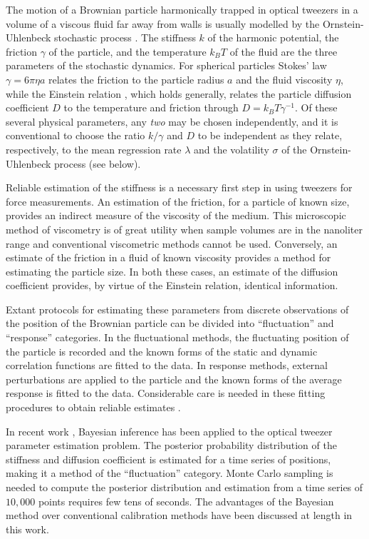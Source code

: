 \documentclass[fleqn,10pt]{wlscirep}
\begin{document}
The motion of a Brownian particle harmonically trapped in optical
tweezers in a volume of a viscous fluid far away from walls is usually
modelled by the Ornstein-Uhlenbeck stochastic process \cite{van1992stochastic,gardiner1985handbook}.
The stiffness $k$ of the harmonic potential, the friction $\gamma$
of the particle, and the temperature $k_{B}T$ of the fluid are the
three parameters of the stochastic dynamics. For spherical particles
Stokes' law $\gamma=6\pi\eta a$ relates the friction to the particle
radius $a$ and the fluid viscosity $\eta$, while the Einstein relation \cite{kubo1966fluctuation},
which holds generally, relates the particle diffusion coefficient
$D$ to the temperature and friction through $D=k_{B}T\gamma^{-1}$.
Of these several physical parameters,
any \emph{two} may be chosen independently, and it is conventional
to choose the ratio $k/\gamma$ and $D$ to be independent as they
relate, respectively, to the mean regression rate $\lambda$ and the
volatility $\sigma$ of the Ornstein-Uhlenbeck process (see below). 

Reliable estimation of the stiffness is a necessary first step in
using tweezers for force measurements. An estimation of the friction,
for a particle of known size, provides an indirect measure of the
viscosity of the medium. This microscopic method of viscometry is
of great utility when sample volumes are in the nanoliter range and
conventional viscometric methods cannot be used. Conversely, an estimate
of the friction in a fluid of known viscosity provides a method for
estimating the particle size. In both these cases, an estimate of
the diffusion coefficient provides, by virtue of the Einstein relation,
identical information.

Extant protocols for estimating these parameters from discrete observations
of the position of the Brownian particle can be divided into ``fluctuation''
and ``response'' categories. In the fluctuational methods, the fluctuating
position of the particle is recorded and the known forms of the static
and dynamic correlation functions are fitted to the data. In response
methods, external perturbations are applied to the particle and the
known forms of the average response is fitted to the data. Considerable
care is needed in these fitting procedures to obtain reliable estimates
\cite{berg2004power}. 

In recent work \cite{richly2013calibrating}, Bayesian inference has
been applied to the optical tweezer parameter estimation problem.
The posterior probability distribution of the stiffness and diffusion
coefficient is estimated for a time series of positions, making it
a method of the ``fluctuation'' category. Monte Carlo sampling is
needed to compute the posterior distribution and estimation from a
time series of $10,000$ points requires few tens of seconds. The
advantages of the Bayesian method over conventional calibration methods
have been discussed at length in this work.
\end{document}
